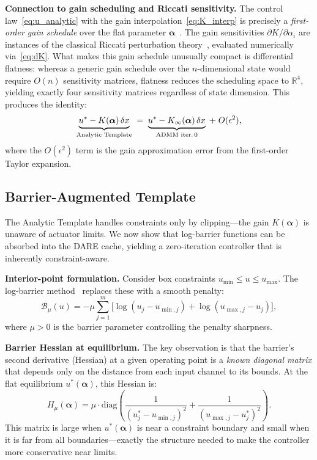\documentclass[letterpaper, 10pt, conference]{IEEEtran}
\newcommand{\R}{\mathbb{R}}
\newcommand{\balpha}{\bm{\alpha}}
\begin{document}
\textbf{Connection to gain scheduling and Riccati sensitivity.}
The control law~\eqref{eq:u_analytic} with the gain
interpolation~\eqref{eq:K_interp} is precisely a
\emph{first-order gain schedule} over the flat parameter
$\balpha$~\cite{rugh2000}.
The gain sensitivities $\partial K / \partial \alpha_i$ are instances
of the classical Riccati perturbation theory~\cite{hewer1971,konstantinov1993},
evaluated numerically via~\eqref{eq:dK}.
What makes this gain schedule unusually compact is
differential flatness: whereas a generic gain schedule over the
$n$-dimensional state would require $O(n)$ sensitivity matrices,
flatness reduces the scheduling space to $\R^4$, yielding
exactly four sensitivity matrices regardless of state dimension.
This produces the identity:
\begin{equation}\label{eq:chain}
  \underbrace{u^* - K(\balpha)\,\delta x}_{\text{Analytic Template}}
  \;=\;
  \underbrace{u^* - K_\infty(\balpha)\,\delta x}_{\text{ADMM iter.\,0}}
  \;+\; O(\epsilon^2),
\end{equation}
where the $O(\epsilon^2)$ term is the gain approximation
error from the first-order Taylor expansion.

\subsection{Barrier-Augmented Template}\label{sec:barrier}

The Analytic Template handles constraints only by
clipping---the gain $K(\balpha)$ is unaware of actuator limits.
We now show that log-barrier functions can be absorbed into
the DARE cache, yielding a zero-iteration controller that is
inherently constraint-aware.

\textbf{Interior-point formulation.}
Consider box constraints $u_{\min} \leq u \leq u_{\max}$.
The log-barrier method~\cite{boyd2004,jordana2023}
replaces these with a smooth penalty:
\begin{equation}\label{eq:barrier}
  \mathcal{B}_\mu(u) = -\mu \sum_{j=1}^{m}
    \bigl[\log(u_j - u_{\min,j})
          + \log(u_{\max,j} - u_j)\bigr],
\end{equation}
where $\mu > 0$ is the barrier parameter controlling the
penalty sharpness.

\textbf{Barrier Hessian at equilibrium.}
The key observation is that the barrier's second derivative
(Hessian) at a given operating point is a \emph{known diagonal
matrix} that depends only on the distance from each input
channel to its bounds.
At the flat equilibrium $u^*(\balpha)$, this Hessian is:
\begin{equation}\label{eq:barrier_hess}
  H_\mu(\balpha) = \mu \cdot \mathrm{diag}\!\left(
    \frac{1}{(u^*_j - u_{\min,j})^2}
    + \frac{1}{(u_{\max,j} - u^*_j)^2}
  \right).
\end{equation}
This matrix is large when $u^*(\balpha)$ is near a
constraint boundary and small when it is far from all
boundaries---exactly the structure needed to make the
controller more conservative near limits.
\end{document}
